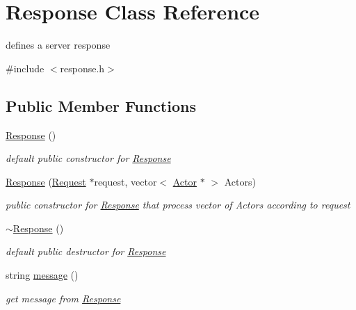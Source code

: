 \hypertarget{classResponse}{}\section{Response Class Reference}
\label{classResponse}


defines a server response  




{\ttfamily \#include $<$response.\+h$>$}

\subsection*{Public Member Functions}
\begin{DoxyCompactItemize}
\item 
\hyperlink{classResponse_aa9b6e391d77fce8daca8bac13730ec8e}{Response} ()\hypertarget{classResponse_aa9b6e391d77fce8daca8bac13730ec8e}{}\label{classResponse_aa9b6e391d77fce8daca8bac13730ec8e}

\begin{DoxyCompactList}\small\item\em default public constructor for \hyperlink{classResponse}{Response} \end{DoxyCompactList}\item 
\hyperlink{classResponse_a63ee2ba4663e70dfe54a9e6589a68e2a}{Response} (\hyperlink{classRequest}{Request} $\ast$request, vector$<$ \hyperlink{classActor}{Actor} $\ast$ $>$ Actors)
\begin{DoxyCompactList}\small\item\em public constructor for \hyperlink{classResponse}{Response} that process vector of Actors according to request \end{DoxyCompactList}\item 
\hyperlink{classResponse_a2a4a6403aaefce73725f17cf63896f84}{$\sim$\+Response} ()\hypertarget{classResponse_a2a4a6403aaefce73725f17cf63896f84}{}\label{classResponse_a2a4a6403aaefce73725f17cf63896f84}

\begin{DoxyCompactList}\small\item\em default public destructor for \hyperlink{classResponse}{Response} \end{DoxyCompactList}\item 
string \hyperlink{classResponse_a517690400a7b7091d03e917f335f7f28}{message} ()
\begin{DoxyCompactList}\small\item\em get message from \hyperlink{classResponse}{Response} \end{DoxyCompactList}\end{DoxyCompactItemize}


